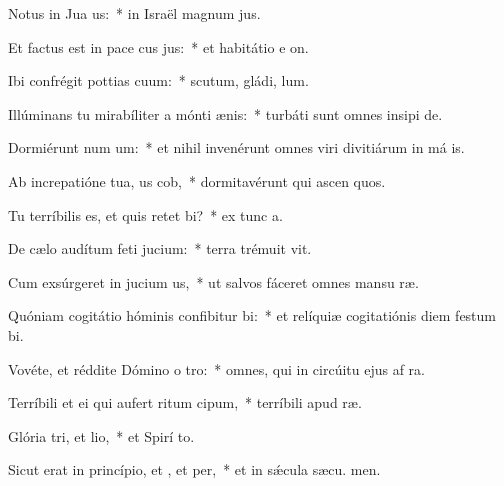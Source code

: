 \item Notus in Jua us:~* in Israël magnum  jus.
\item Et factus est in pace cus jus:~* et habitátio e  on.
\item Ibi confrégit pottias cuum:~* scutum, gládi,  lum.
\item Illúminans tu mirabíliter a mónti ænis:~* turbáti sunt omnes insipi de.
\item Dormiérunt num um:~* et nihil invenérunt omnes viri divitiárum in má is.
\item Ab increpatióne tua, us cob,~* dormitavérunt qui ascen quos.
\item Tu terríbilis es, et quis retet bi?~* ex tunc  a.
\item De cælo audítum feti jucium:~* terra trémuit  vit.
\item Cum exsúrgeret in jucium us,~* ut salvos fáceret omnes mansu ræ.
\item Quóniam cogitátio hóminis confibitur bi:~* et relíquiæ cogitatiónis diem festum  bi.
\item Vovéte, et réddite Dómino o tro:~* omnes, qui in circúitu ejus af ra.
\item Terríbili et ei qui aufert ritum cipum,~* terríbili apud  ræ.
\item Glória tri, et lio,~* et Spirí to.
\item Sicut erat in princípio, et , et per,~* et in sǽcula sæcu. men.
